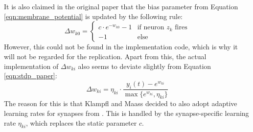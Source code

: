 \\ \ \\ %
It is also claimed in the original paper that the bias parameter from Equation \ref{eqn:membrane_potential} is updated by the following rule:
\begin{equation*}
    \Delta w_{k0} = 
    \begin{cases}
        c\cdot e^{-w_{k0}} -1 & \text{if neuron } z_k \text{ fires}\\
        -1 & \text{else}
    \end{cases}
\end{equation*}
However, this could not be found in the implementation code, which is why it will not be regarded for the replication. Apart from this, the actual implementation of $\Delta w_{ki}$ also seems to deviate slightly from Equation \ref{eqn:stdp_paper}:
\begin{equation}
    \Delta w_{ki} = \eta_{ki} \cdot \frac{y_i(t)-e^{w_{ki}}}{\max \{e^{w_{ki}}, \eta_{ki}\}}
    \label{eqn:stdp_real}
\end{equation}
The reason for this is that Klampfl and Maass decided to also adopt adaptive learning rates for synapses from \parencite{nessler_et_al_2013}. This is handled by the synapse-specific learning rate $\eta_{ki}$, which replaces the static parameter $c$.


